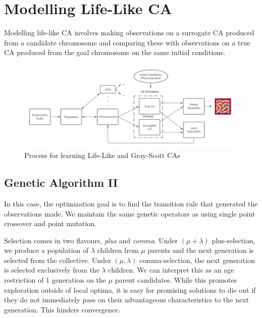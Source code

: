 \chapter{Modelling Life-Like CA} \label{lifelike}

Modelling life-like CA involves making observations on a surrogate CA produced from a candidate chromosome and comparing these with observations on a true CA produced from the goal chromosome on the same initial conditions.

\begin{figure}[!h]
\centering
    \includegraphics[width=\textwidth]{images/dataflow.png}
    \caption{Process for learning Life-Like and Gray-Scott CAs}
\label{fig:dataflow}
\end{figure}

\section{Genetic Algorithm II}

In this case, the optimization goal is to find the transition rule that generated the observations made. We maintain the same genetic operators as  using single point crossover and point mutation.

Selection comes in two flavours, \textit{plus} and \textit{comma}. Under  $(\mu + \lambda)$ plus-selection, we produce a population of $\lambda$ children from $\mu$ parents and the next generation is selected from the collective. Under $(\mu, \lambda)$ comma-selection, the next generation is selected exclusively from the $\lambda$ children. We can interpret this as an age restriction of 1 generation on the $\mu$ parent candidates. While this promotes exploration outside of local optima, it is easy for promising solutions to die out if they do not immediately pass on their advantageous characteristics to the next generation. This hinders convergence.\\

